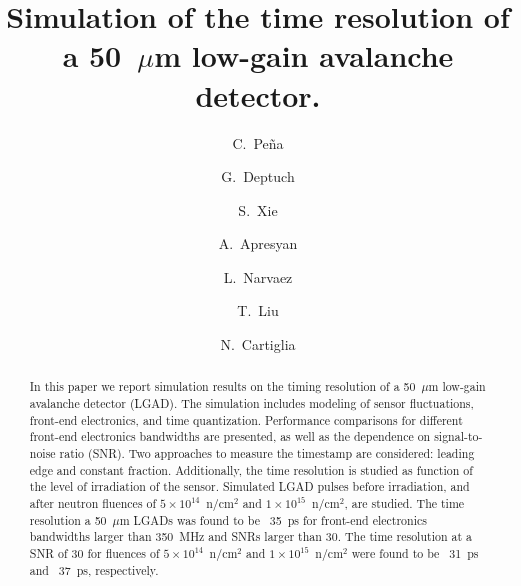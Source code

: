 \documentclass[preprint,1p]{elsarticle}
\begin{document}
\linenumbers

\begin{frontmatter}



\title{Simulation of the time resolution of a 50~$\mu$m low-gain avalanche detector.}


\author[1,2]{C.~Pe\~na}
\author[1]{G.~Deptuch}
\author[2]{S.~Xie}
\author[1]{A.~Apresyan}
\author[2]{L.~Narvaez}
\author[1]{T.~Liu}
\author[3]{N.~Cartiglia}


\address[1]{Fermi National Accelerator Laboratory, Batavia, IL, USA}
\address[2]{California Institute of Technology, Pasadena, CA, USA}
\address[3]{INFN, Torino, Italy}

\begin{abstract}
In this paper we report simulation results on the timing resolution of a 50~$\mu$m low-gain avalanche detector (LGAD).
The simulation includes modeling of sensor fluctuations, front-end electronics, and time quantization.
Performance comparisons for different front-end electronics bandwidths are presented, as well as
the dependence on signal-to-noise ratio (SNR). Two approaches to measure the timestamp are 
considered: leading edge and constant fraction. Additionally, the time resolution is studied as function of the 
level of irradiation of the sensor. Simulated LGAD pulses before irradiation, and after neutron fluences of
 $5\times 10^{14}$~n/cm$^2$ and $1\times 10^{15}$~n/cm$^2$, are studied.
 The time resolution a 50~$\mu$m LGADs was found to be ~35~\si{ps} for front-end electronics bandwidths larger than 350~\si{MHz} and SNRs larger than 30.
 The time resolution at a SNR of 30 for fluences of $5\times 10^{14}$~n/cm$^2$ and $1\times 10^{15}$~n/cm$^2$ were found to be ~31~\si{ps}
  and ~37~\si{ps}, respectively.
\end{abstract}


\end{frontmatter}
\end{document}
